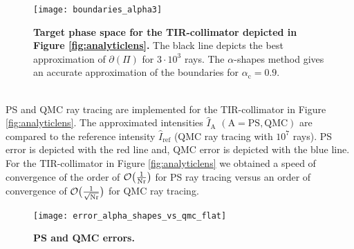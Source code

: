  \begin{figure}[h]
  \begin{center}
       \texttt{[image: boundaries\_alpha3]}
   \end{center}
        \caption{\textbf{Target phase space for the TIR-collimator depicted in
        Figure \ref{fig:analyticlens}.} The black line depicts the best approximation of $\partial$$(\Pi)$ for $3\cdot 10^3$ rays. 
The $\alpha$-shapes method gives an accurate approximation of the boundaries for $\alpha_\textrm{c} = 0.9$.}
  \label{fig:Tir2}
\end{figure}
\\ \indent PS and QMC ray tracing are implemented for the TIR-collimator in Figure \ref{fig:analyticlens}. The approximated intensities $\hat{I}_{\textrm{A}}$ $(\textrm{A} = \textrm{PS}, \textrm{QMC})$ are compared to the reference intensity $\hat{I}_{\textrm{ref}}$ (QMC ray tracing with $10^7$ rays).
PS error is depicted with the red line and, QMC error is depicted with the blue line. \\ \indent
For the TIR-collimator in Figure \ref{fig:analyticlens} we obtained a speed of convergence of the order of $\mathcal{O}\big(\frac{1}{\textrm{Nr}}\big)$ for PS ray tracing versus an order of convergence of $\mathcal{O}\big(\frac{1}{\sqrt{\textrm{Nr}}}\big)$ for QMC ray tracing.
\begin{figure}[t]
 \begin{center}
   \texttt{[image: error\_alpha\_shapes\_vs\_qmc\_flat]}
    \end{center}
     \caption{\textbf{PS and QMC errors.}}
 \label{fig:error2}
\end{figure}
